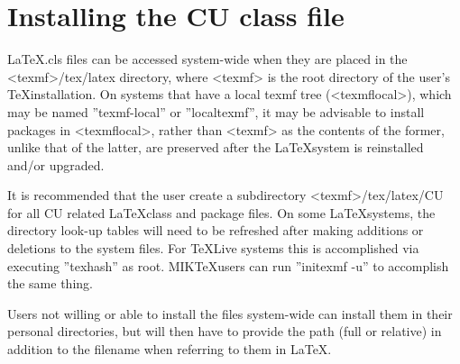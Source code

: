 
\chapter{Installing the CU class file}

\LaTeX.cls files can be accessed system-wide when they are placed in the
<texmf>/tex/latex directory, where <texmf> is the root directory of the user’s \TeX installation. On systems that have a local texmf tree (<texmflocal>), which
may be named ''texmf-local'' or ''localtexmf'', it may be advisable to install packages in <texmflocal>, rather than <texmf> as the contents of the former, unlike that of the latter, are preserved after the \LaTeX system is reinstalled and/or upgraded.

It is recommended that the user create a subdirectory <texmf>/tex/latex/CU for all CU related \LaTeX class and package files. On some \LaTeX systems, the directory look-up tables will need to be refreshed after making additions or deletions to the system files. For \TeX Live systems this is accomplished via executing ''texhash'' as root. MIK\TeX users can run ''initexmf -u'' to accomplish the same thing.

Users not willing or able to install the files system-wide can install them in their personal directories, but will then have to provide the path (full or relative) in addition to the filename when referring to them in \LaTeX.

